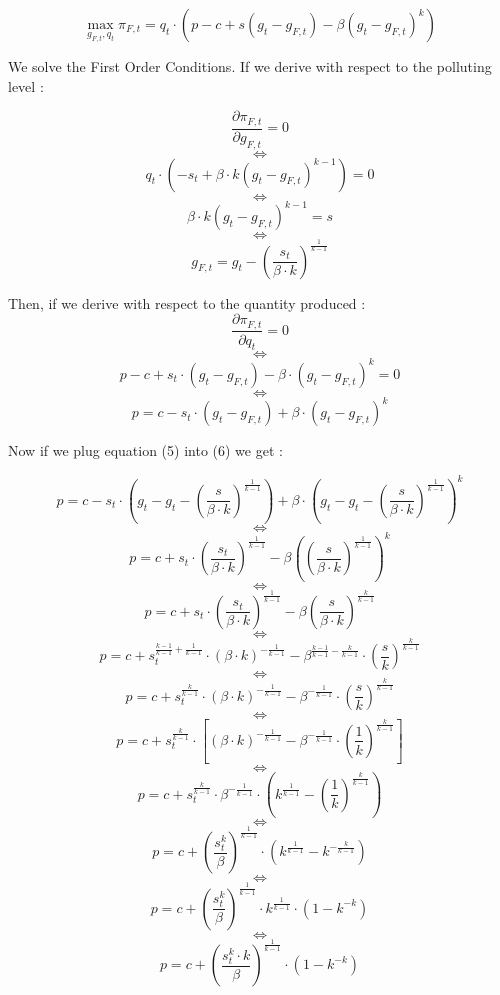 \documentclass{article}
\begin{document}
$$ \max_{g_{F,t},q_{t}}{\pi_{F,t}=q_{t}\cdot\left(p-c+s(g_{t}-g_{F,t})-\beta(g_{t}-g_{F,t})^{k}\right)}$$

We solve the First Order Conditions. If we derive with respect to the polluting level : 

$$\frac{\partial \pi_{F,t}}{\partial g_{F,t}}=0$$
$$\iff$$
$$q_t\cdot(-s_{t}+\beta\cdot k(g_{t}-g_{F,t})^{k-1})=0$$
$$\iff$$
$$\beta\cdot k(g_{t}-g_{F,t})^{k-1}=s$$
$$\iff$$
\begin{equation}
    g_{F,t}=g_{t}-\left(\frac{s_{t}}{\beta\cdot k}\right)^{\frac{1}{k-1}}
\end{equation}

Then, if we derive with respect to the quantity produced :
$$\frac{\partial \pi_{F,t}}{\partial q_{t}}=0$$
$$\iff$$
$$p-c+s_{t}\cdot(g_{t}-g_{F,t})-\beta\cdot(g_{t}-g_{F,t})^{k}=0$$
$$\iff$$
\begin{equation}
    p=c-s_{t}\cdot(g_{t}-g_{F,t})+\beta\cdot(g_{t}-g_{F,t})^{k} 
\end{equation}

Now if we plug equation (5) into (6) we get : 

$$ p=c-s_{t}\cdot\left(g_{t}-g_{t}-\left(\frac{s}{\beta\cdot k}\right)^{\frac{1}{k-1}}\right)+\beta\cdot\left(g_{t}-g_{t}-\left(\frac{s}{\beta\cdot k}\right)^{\frac{1}{k-1}}\right)^{k}$$
$$\iff$$
$$p=c+s_{t}\cdot\left(\frac{s_{t}}{\beta\cdot k}\right)^{\frac{1}{k-1}}-\beta\left(\left(\frac{s}{\beta\cdot k}\right)^{\frac{1}{k-1}}\right)^{k}$$
$$\iff$$
$$p=c+s_{t}\cdot\left(\frac{s_{t}}{\beta\cdot k}\right)^{\frac{1}{k-1}}-\beta\left(\frac{s}{\beta\cdot k}\right)^{\frac{k}{k-1}}$$
$$\iff$$
$$p=c+s_{t}^{\frac{k-1}{k-1}+\frac{1}{k-1}}\cdot\left({\beta\cdot k}\right)^{-\frac{1}{k-1}}-\beta^{\frac{k-1}{k-1}-\frac{k}{k-1}}\cdot\left(\frac{s}{k}\right)^{\frac{k}{k-1}}$$
$$\iff$$
$$p=c+s_{t}^{\frac{k}{k-1}}\cdot\left({\beta\cdot k}\right)^{-\frac{1}{k-1}}-\beta^{-\frac{1}{k-1}}\cdot\left(\frac{s}{k}\right)^{\frac{k}{k-1}}$$
$$\iff$$
$$p=c+s_{t}^{\frac{k}{k-1}}\cdot\left[\left({\beta\cdot k}\right)^{-\frac{1}{k-1}}-\beta^{-\frac{1}{k-1}}\cdot\left(\frac{1}{k}\right)^{\frac{k}{k-1}}\right]$$
$$\iff$$
$$p=c+s_{t}^{\frac{k}{k-1}}\cdot{\beta}^{-\frac{1}{k-1}}\cdot\left(k^{\frac{1}{k-1}}-\left(\frac{1}{k}\right)^{\frac{k}{k-1}}\right)$$
$$\iff$$
$$p=c+\left(\frac{s_{t}^k}{\beta}\right)^{\frac{1}{k-1}}\cdot\left(k^{\frac{1}{k-1}}-{k}^{-\frac{k}{k-1}}\right)$$
$$\iff$$
$$p=c+\left(\frac{s_{t}^k}{\beta}\right)^{\frac{1}{k-1}}\cdot{k}^{\frac{1}{k-1}}\cdot\left(1-{k}^{-k}\right)$$
$$\iff$$
\begin{equation}
    p=c+\left(\frac{s_{t}^k\cdot k}{\beta}\right)^{\frac{1}{k-1}}\cdot\left(1-{k}^{-k}\right)
\end{equation}
\end{document}
